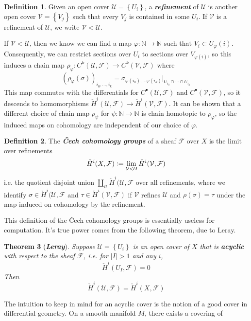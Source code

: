 \documentclass[psamsfonts, 12pt]{amsart}
\newtheorem{thm}{Theorem}[section]
\theoremstyle{definition}
\newtheorem{defn}[thm]{Definition}
\theoremstyle{remark}
\newcommand{\ib}[1]{\textbf{\textit{#1}}}
\newcommand{\N}{\mathbb{N}}
\newcommand{\set}[1]{\left\lbrace #1 \right\rbrace}
\newcommand{\defeq}{\vcentcolon=}
\begin{document}
%
\begin{defn}
Given an open cover $\mathcal{U} = \set{U_i}$, a \ib{refinement} of $\mathcal{U}$
is another open cover $\mathcal{V} = \set{V_j}$ such that every $V_j$ is contained
in some $U_i$. If $\mathcal{V}$ is a refinement of $\mathcal{U}$, we write
$\mathcal{V} < \mathcal{U}$.
\end{defn}
%
If $\mathcal{V} < \mathcal{U}$, then we know we can find a map
$\varphi : \N \to \N$ such that $V_i \subset U_\varphi(i)$. Consequently, we
can restrict sections over $U_i$ to sections over $V_{\varphi(i)}$, so this
induces a chain map
$\rho_\varphi : C^k(\mathcal{U}, \mathcal{F}) \to C^k(\mathcal{V},\mathcal{F})$
where
\[
(\rho_\varphi(\sigma))_{i_0,\ldots, i_k}
= \sigma_{\varphi(i_0),\ldots \varphi(i_k)}\vert_{U_{i_0} \cap \cdots \cap U_{i_k}}
\]
This map commutes with the differentials for $C^\bullet(\mathcal{U},\mathcal{F})$
and $C^\bullet(\mathcal{V},\mathcal{F})$, so it descends to homomorphisms
$\check{H}^i(\mathcal{U},\mathcal{F}) \to \check{H}^i(\mathcal{V}, \mathcal{F})$.
It can be shown that a different choice of chain map $\rho_\psi$ for
$\psi : \N \to \N$ is chain homotopic to $\rho_\varphi$, so the induced maps
on cohomology are independent of our choice of $\varphi$.
%
\begin{defn}
The \ib{\v{C}ech cohomology groups} of a sheaf $\mathcal{F}$ over $X$ is the limit over
refinements
\[
\check{H}^i(X, \mathcal{F})
\defeq \lim_{\mathcal{V} < \mathcal{U}} \check{H}^i(\mathcal{V}, \mathcal{F})
\]
i.e. the quotient disjoint union
$\amalg_\mathcal{U}\check{H}^i(\mathcal{U}, \mathcal{F}$
over all refinements, where we identify $\sigma \in \check{H}^i(\mathcal{U}, \mathcal{F}$
and $\tau \in \check{H}^i(\mathcal{V}, \mathcal{F})$ if
$\mathcal{V}$ refines $\mathcal{U}$ and $\rho(\sigma) = \tau$ under the map induced on
cohomology by the refinement.
\end{defn}
%
This definition of the \v{C}ech cohomology groups is essentially useless for
computation. It's true power comes from the following theorem, due to Leray.
%
\begin{thm}[\ib{Leray}]
Suppose $\mathcal{U} = \set{U_i}$ is an open cover of $X$ that is \ib{acyclic} with
respect to the sheaf $\mathcal{F}$, i.e. for $|I| > 1$ and any $i$,
\[
\check{H}^i(U_I, \mathcal{F}) = 0
\]
Then
\[
\check{H}^i(\mathcal{U}, \mathcal{F}) = \check{H}^i(X, \mathcal{F})
\]
\end{thm}
%
The intuition to keep in mind for an acyclic cover is the notion of a good cover
in differential geometry. On a smooth manifold $M$, there exists a covering of
\end{document}
